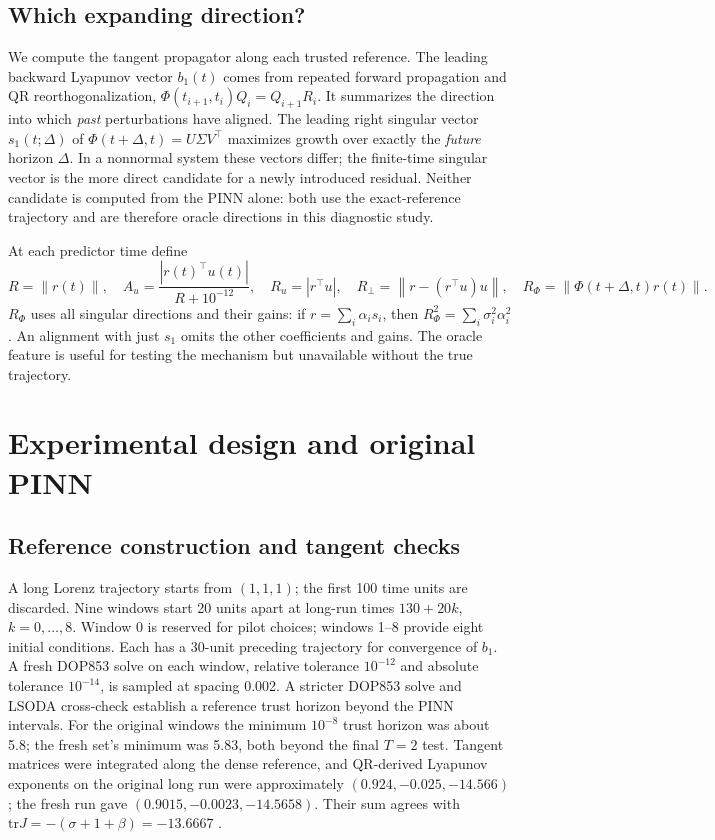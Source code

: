 \documentclass[11pt,a4paper]{article}
\newcommand{\norm}[1]{\left\lVert #1\right\rVert}
\begin{document}
\subsection{Which expanding direction?}
We compute the tangent propagator along each trusted reference. The leading backward Lyapunov vector $b_1(t)$ comes from repeated forward propagation and QR reorthogonalization, $\Phi(t_{i+1},t_i)Q_i=Q_{i+1}R_i$. It summarizes the direction into which \emph{past} perturbations have aligned. The leading right singular vector $s_1(t;\Delta)$ of $\Phi(t+\Delta,t)=U\Sigma V^\top$ maximizes growth over exactly the \emph{future} horizon $\Delta$. In a nonnormal system these vectors differ; the finite-time singular vector is the more direct candidate for a newly introduced residual. Neither candidate is computed from the PINN alone: both use the exact-reference trajectory and are therefore oracle directions in this diagnostic study.

At each predictor time define
\begin{equation}\label{eq:features}
R=\norm{r(t)},\quad A_u=\frac{|r(t)^\top u(t)|}{R+10^{-12}},\quad
R_u=|r^\top u|,\quad R_\perp=\norm{r-(r^\top u)u},\quad
R_\Phi=\norm{\Phi(t+\Delta,t)r(t)}.
\end{equation}
$R_\Phi$ uses all singular directions and their gains: if $r=\sum_i\alpha_i s_i$, then $R_\Phi^2=\sum_i\sigma_i^2\alpha_i^2$. An alignment with just $s_1$ omits the other coefficients and gains. The oracle feature is useful for testing the mechanism but unavailable without the true trajectory.

\section{Experimental design and original PINN}
\subsection{Reference construction and tangent checks}
A long Lorenz trajectory starts from $(1,1,1)$; the first 100 time units are discarded. Nine windows start 20 units apart at long-run times $130+20k$, $k=0,\ldots,8$. Window 0 is reserved for pilot choices; windows 1--8 provide eight initial conditions. Each has a 30-unit preceding trajectory for convergence of $b_1$. A fresh DOP853 solve on each window, relative tolerance $10^{-12}$ and absolute tolerance $10^{-14}$, is sampled at spacing 0.002. A stricter DOP853 solve and LSODA cross-check establish a reference trust horizon beyond the PINN intervals. For the original windows the minimum $10^{-8}$ trust horizon was about 5.8; the fresh set's minimum was 5.83, both beyond the final $T=2$ test. Tangent matrices were integrated along the dense reference, and QR-derived Lyapunov exponents on the original long run were approximately $(0.924,-0.025,-14.566)$; the fresh run gave $(0.9015,-0.0023,-14.5658)$. Their sum agrees with $\mathrm{tr}J=-(\sigma+1+\beta)=-13.6667$ \cite{phase2,phase3,validation}.
\end{document}
